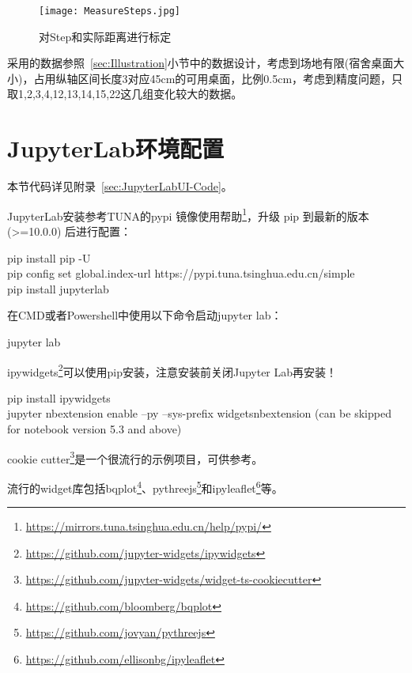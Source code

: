 \begin{figure}[htbp]
    \centering
    \texttt{[image: MeasureSteps.jpg]}
    \caption{对Step和实际距离进行标定}
    \label{fig:MeasureSteps}
\end{figure}

采用的数据参照~\ref{sec:Illustration}小节中的数据设计，考虑到场地有限(宿舍桌面大小)，占用纵轴区间长度3对应45cm的可用桌面，比例0.5cm，考虑到精度问题，只取1,2,3,4,12,13,14,15,22这几组变化较大的数据。

\section{JupyterLab环境配置}

本节代码详见附录~\ref{sec:JupyterLabUI-Code}。

JupyterLab安装参考TUNA的pypi 镜像使用帮助\footnote{\url{https://mirrors.tuna.tsinghua.edu.cn/help/pypi/}}，升级 pip 到最新的版本 (>=10.0.0) 后进行配置：

\begin{tcolorbox}
    pip install pip -U \\
    pip config set global.index-url https://pypi.tuna.tsinghua.edu.cn/simple \\
    pip install jupyterlab
\end{tcolorbox}

在CMD或者Powershell中使用以下命令启动jupyter lab：

\begin{tcolorbox}
    jupyter lab
\end{tcolorbox}

ipywidgets\footnote{\url{https://github.com/jupyter-widgets/ipywidgets}}可以使用pip安装，注意安装前关闭Jupyter Lab再安装！

\begin{tcolorbox}
    pip install ipywidgets \\
    jupyter nbextension enable --py --sys-prefix widgetsnbextension  (can be skipped for notebook version 5.3 and above)
\end{tcolorbox}

cookie cutter\footnote{\url{https://github.com/jupyter-widgets/widget-ts-cookiecutter}}是一个很流行的示例项目，可供参考。

流行的widget库包括bqplot\footnote{\url{https://github.com/bloomberg/bqplot}}、pythreejs\footnote{\url{https://github.com/jovyan/pythreejs}}和ipyleaflet\footnote{\url{https://github.com/ellisonbg/ipyleaflet}}等。

